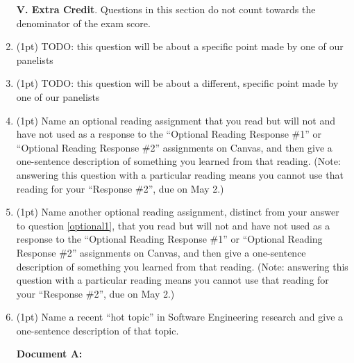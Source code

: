 \documentclass{report}
\newif\ifkey
\newcommand{\answerlong}[1]{\ifkey\color{red}\textbf{#1}\color{black}\else\vspace{0.5in}\fi\xspace}
\newcommand{\ecpts}[1]{\addtocounter{ecpoints}{#1}(#1pt)}
\begin{document}
\begin{spacing}{1.4}
\begin{enumerate}[leftmargin=*]
    \newpage
    
    \textbf{V. Extra Credit}. Questions in this section do not count towards the denominator of the exam score.

  \item \ecpts{1} TODO: this question will be about a specific point made by one of our panelists
    \answerlong{TODO}

  \item \ecpts{1} TODO: this question will be about a different, specific point made by one of our panelists
    \answerlong{TODO}
  
  \item \ecpts{1} \label{optional1} Name an optional reading assignment that you read but will not and have not used as a response to the ``Optional Reading Response \#1''
    or ``Optional Reading Response \#2'' assignments on Canvas, and then give a one-sentence description of something you learned from that reading.
    (Note: answering this question with a particular reading means you cannot use that reading for your ``Response \#2'', due on May 2.)
    \answerlong{Answers vary.}
    
  \item \ecpts{1} Name another optional reading assignment, distinct from your answer to question \ref{optional1},
    that you read but will not and have not used as a response to the ``Optional Reading Response \#1''
    or ``Optional Reading Response \#2'' assignments on Canvas, and then give a one-sentence description of something you learned from that reading.
    (Note: answering this question with a particular reading means you cannot use that reading for your ``Response \#2'', due on May 2.)
    \answerlong{Answers vary.}
    
  \item \ecpts{1} Name a recent ``hot topic'' in Software Engineering research and give a one-sentence description of that topic.
    \answerlong{Expected answers are the topics covered in class on 20 April.}
    
    \newpage

    \textbf{Document A:}
    

\end{enumerate}
\end{spacing}
\end{document}
